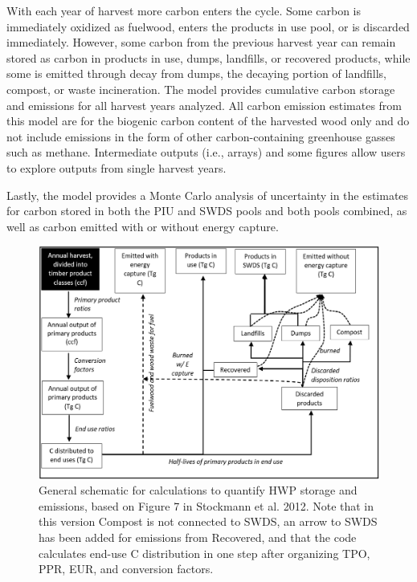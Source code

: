 \documentclass[
  openany]{book}
\begin{document}
With each year of harvest more carbon enters the cycle. Some carbon is
immediately oxidized as fuelwood, enters the products in use pool, or is
discarded immediately. However, some carbon from the previous harvest
year can remain stored as carbon in products in use, dumps, landfills,
or recovered products, while some is emitted through decay from dumps,
the decaying portion of landfills, compost, or waste incineration. The
model provides cumulative carbon storage and emissions for all harvest
years analyzed. All carbon emission estimates from this model are for
the biogenic carbon content of the harvested wood only and do not
include emissions in the form of other carbon-containing greenhouse
gasses such as methane. Intermediate outputs (i.e., arrays) and some
figures allow users to explore outputs from single harvest years.

Lastly, the model provides a Monte Carlo analysis of uncertainty in the
estimates for carbon stored in both the PIU and SWDS pools and both
pools combined, as well as carbon emitted with or without energy
capture.

\begin{figure}
\includegraphics[width=1\linewidth]{images/OverviewModelSchematic} \caption{General schematic for calculations to quantify HWP storage and emissions, based on Figure 7 in Stockmann et al. 2012.  Note that in this version Compost is not connected to SWDS, an arrow to SWDS has been added for emissions from Recovered, and that the code calculates end-use C distribution in one step after organizing TPO, PPR, EUR, and conversion factors.}\label{fig:overview-fig}
\end{figure}
\end{document}
